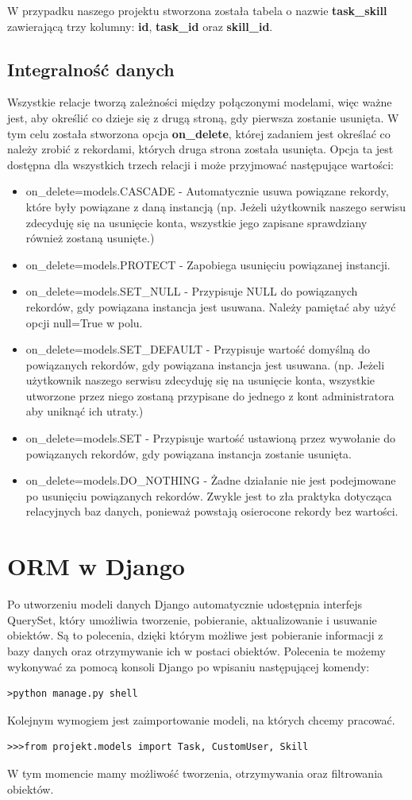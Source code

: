 \documentclass[oneside,polski,logo,indent]{amuthesis}
\begin{document}
\begin{enumerate}
\begin{enumerate}
W przypadku naszego projektu stworzona została tabela o nazwie \textbf{task\_skill} zawierającą trzy kolumny: \textbf{id}, \textbf{task\_id} oraz \textbf{skill\_id}.
\subsection{Integralność danych}
Wszystkie relacje tworzą zależności między połączonymi modelami, więc ważne jest, aby określić co dzieje się z drugą stroną, gdy pierwsza zostanie usunięta.
W tym celu została stworzona opcja \textbf{on\_delete}, której zadaniem jest określać co należy zrobić z rekordami, których druga strona została usunięta. Opcja ta jest dostępna dla wszystkich trzech relacji i może przyjmować następujące wartości:
\begin{itemize}
\item on\_delete=models.CASCADE - Automatycznie usuwa powiązane rekordy, które były powiązane z daną instancją (np. Jeżeli użytkownik naszego serwisu zdecyduję się na usunięcie konta, wszystkie jego zapisane sprawdziany również zostaną usunięte.)
\item on\_delete=models.PROTECT - Zapobiega usunięciu powiązanej instancji.
\item on\_delete=models.SET\_NULL - Przypisuje NULL do powiązanych rekordów, gdy powiązana instancja jest usuwana. Należy pamiętać aby użyć opcji null=True w polu.
\item on\_delete=models.SET\_DEFAULT - Przypisuje wartość domyślną do powiązanych rekordów, gdy powiązana instancja jest usuwana. (np. Jeżeli użytkownik naszego serwisu zdecyduję się na usunięcie konta, wszystkie utworzone przez niego zostaną przypisane do jednego z kont administratora aby uniknąć ich utraty.)
\item on\_delete=models.SET - Przypisuje wartość ustawioną przez wywołanie do powiązanych rekordów, gdy powiązana instancja zostanie usunięta.
\item on\_delete=models.DO\_NOTHING - Żadne działanie nie jest podejmowane po usunięciu powiązanych rekordów. Zwykle jest to zła praktyka dotycząca relacyjnych baz danych, ponieważ powstają osierocone rekordy bez wartości.
\end{itemize}
\section{ORM w Django}
Po utworzeniu modeli danych Django automatycznie udostępnia interfejs QuerySet, który umożliwia tworzenie, pobieranie, aktualizowanie i usuwanie obiektów. Są to polecenia, dzięki którym możliwe jest pobieranie informacji z bazy danych oraz otrzymywanie ich w postaci obiektów. Polecenia te możemy wykonywać za pomocą konsoli Django po wpisaniu następującej komendy:
\begin{lstlisting}[style=DOS]
>python manage.py shell
\end{lstlisting}
Kolejnym wymogiem jest zaimportowanie modeli, na których chcemy pracować.
\begin{lstlisting}[style=DOS]
>>>from projekt.models import Task, CustomUser, Skill
\end{lstlisting}
W tym momencie mamy możliwość tworzenia, otrzymywania oraz filtrowania obiektów.

\end{enumerate}
\end{enumerate}
\end{document}
